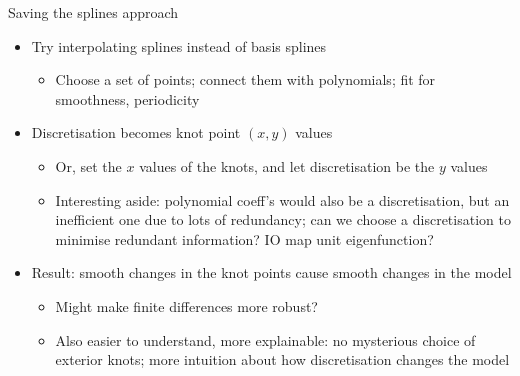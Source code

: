 \documentclass[presentation]{beamer}
\begin{document}
\begin{frame}[<+->][label={sec:org051a3e9}]{Saving the splines approach}
\begin{itemize}
\item Try interpolating splines instead of basis splines
\begin{itemize}
\item Choose a set of points; connect them with polynomials; fit for smoothness, periodicity
\end{itemize}
\end{itemize}
\vfill
\begin{itemize}
\item Discretisation becomes knot point \((x,y)\) values
\begin{itemize}
\item Or, set the \(x\) values of the knots, and let discretisation be the \(y\) values
\item Interesting aside: polynomial coeff's would also be a discretisation, but an inefficient one due to lots of redundancy; can we choose a discretisation to minimise redundant information? IO map unit eigenfunction?
\end{itemize}
\end{itemize}
\vfill
\begin{itemize}
\item Result: smooth changes in the knot points cause smooth changes in the model
\begin{itemize}
\item Might make finite differences more robust?
\item Also easier to understand, more explainable: no mysterious choice of exterior knots; more intuition about how discretisation changes the model
\end{itemize}
\end{itemize}
\end{frame}
\end{document}
